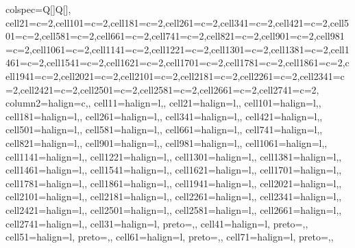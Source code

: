 \begin{table}
\centering
\begin{talltblr}[         %
caption={Technology Adoption Models:  United Kingdom},
note{}={* p \num{< 0.1}, ** p \num{< 0.05}, *** p \num{< 0.01}},
note{ }={* p < 0.1, ** p < 0.05, *** p < 0.01},
]                     %
{                     %
colspec={Q[]Q[]},
cell{2}{1}={c=2}{},cell{10}{1}={c=2}{},cell{18}{1}={c=2}{},cell{26}{1}={c=2}{},cell{34}{1}={c=2}{},cell{42}{1}={c=2}{},cell{50}{1}={c=2}{},cell{58}{1}={c=2}{},cell{66}{1}={c=2}{},cell{74}{1}={c=2}{},cell{82}{1}={c=2}{},cell{90}{1}={c=2}{},cell{98}{1}={c=2}{},cell{106}{1}={c=2}{},cell{114}{1}={c=2}{},cell{122}{1}={c=2}{},cell{130}{1}={c=2}{},cell{138}{1}={c=2}{},cell{146}{1}={c=2}{},cell{154}{1}={c=2}{},cell{162}{1}={c=2}{},cell{170}{1}={c=2}{},cell{178}{1}={c=2}{},cell{186}{1}={c=2}{},cell{194}{1}={c=2}{},cell{202}{1}={c=2}{},cell{210}{1}={c=2}{},cell{218}{1}={c=2}{},cell{226}{1}={c=2}{},cell{234}{1}={c=2}{},cell{242}{1}={c=2}{},cell{250}{1}={c=2}{},cell{258}{1}={c=2}{},cell{266}{1}={c=2}{},cell{274}{1}={c=2}{},
column{2}={}{halign=c,},
cell{1}{1}={}{halign=l,},
cell{2}{1}={}{halign=l,},
cell{10}{1}={}{halign=l,},
cell{18}{1}={}{halign=l,},
cell{26}{1}={}{halign=l,},
cell{34}{1}={}{halign=l,},
cell{42}{1}={}{halign=l,},
cell{50}{1}={}{halign=l,},
cell{58}{1}={}{halign=l,},
cell{66}{1}={}{halign=l,},
cell{74}{1}={}{halign=l,},
cell{82}{1}={}{halign=l,},
cell{90}{1}={}{halign=l,},
cell{98}{1}={}{halign=l,},
cell{106}{1}={}{halign=l,},
cell{114}{1}={}{halign=l,},
cell{122}{1}={}{halign=l,},
cell{130}{1}={}{halign=l,},
cell{138}{1}={}{halign=l,},
cell{146}{1}={}{halign=l,},
cell{154}{1}={}{halign=l,},
cell{162}{1}={}{halign=l,},
cell{170}{1}={}{halign=l,},
cell{178}{1}={}{halign=l,},
cell{186}{1}={}{halign=l,},
cell{194}{1}={}{halign=l,},
cell{202}{1}={}{halign=l,},
cell{210}{1}={}{halign=l,},
cell{218}{1}={}{halign=l,},
cell{226}{1}={}{halign=l,},
cell{234}{1}={}{halign=l,},
cell{242}{1}={}{halign=l,},
cell{250}{1}={}{halign=l,},
cell{258}{1}={}{halign=l,},
cell{266}{1}={}{halign=l,},
cell{274}{1}={}{halign=l,},
cell{3}{1}={}{halign=l, preto={\hspace{1em}},},
cell{4}{1}={}{halign=l, preto={\hspace{1em}},},
cell{5}{1}={}{halign=l, preto={\hspace{1em}},},
cell{6}{1}={}{halign=l, preto={\hspace{1em}},},
cell{7}{1}={}{halign=l, preto={\hspace{1em}},},
}
\end{talltblr}
\end{table}
